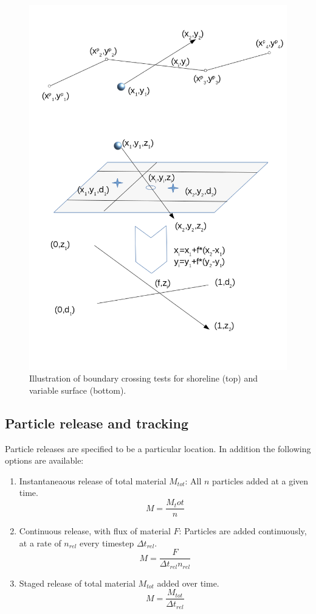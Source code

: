 \documentclass[a4paper]{article}
\begin{document}
\begin{figure}
\includegraphics[width=\textwidth]{intersect.png}
\caption{Illustration of boundary crossing tests for shoreline (top) and variable surface (bottom).}
\end{figure}

\subsection{Particle release and tracking}
Particle releases are specified to be a particular location. In addition the following options are available:
\begin{enumerate}
\item Instantaneaous release of total material $M_{tot}$: All $n$ particles added at a given time.
\begin{equation} M=\frac{M_tot}{n} \end{equation}
\item Continuous release, with flux of material $F$: Particles are added continuously, at a rate of $n_{rel}$ every timestep $\Delta t_{rel}$.
\begin{equation}M=\frac{F}{\Delta t_{rel} n_{rel}}\end{equation} 
\item Staged release of total material $M_{tot}$ added over time.
\begin{equation}M=\frac{M_{tot}}{\Delta t_{rel}}\end{equation}
\end{enumerate}
\end{document}
